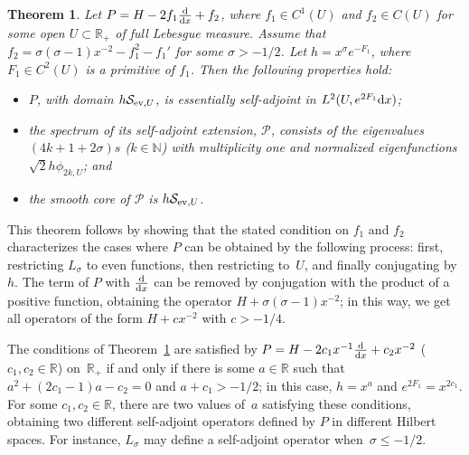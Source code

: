 \documentclass[11pt]{article}
\newtheorem{Theorem}{Theorem}[section]
\newcommand{\R}{\mathbb{R}}
\newcommand{\N}{\mathbb{N}}
\newcommand{\PP}{\mathcal{P}}
\renewcommand{\SS}{\mathcal{S}}
\begin{document}
\begin{Theorem}\label{t:P}
  Let $P=H-2f_1 \frac{{\rm d}}{{\rm d}x}+f_2$, where $f_1\in C^1(U)$ and $f_2\in C(U)$ for some open $U\subset\R_+$ of full Lebesgue measure. Assume that $f_2=\sigma(\sigma-1)x^{-2}-f_1^2-f_1'$ for some $\sigma>-1/2$. Let $h=x^\sigma e^{-F_1}$, where $F_1\in C^2(U)$ is a primitive of $f_1$. Then the following properties hold:
    \begin{itemize}\itemsep=0pt

      \item[$(i)$] $P$, with domain $h \SS_{\text{\rm ev},U}$, is essentially self-adjoint in $L^2(U,e^{2F_1}{\rm d}x)$;

      \item[$(ii)$] the spectrum of its self-adjoint extension, $\PP$, consists of the eigenvalues $(4k+1+2\sigma)s$ {\rm(}$k\in\N${\rm)} with multiplicity one and normalized eigenfunctions $\sqrt{2} h\phi_{2k,U}$; and

       \item[$(iii)$] the smooth core of $\PP$ is $h\SS_{\text{\rm ev},U}$.

    \end{itemize}
\end{Theorem}

This theorem follows by showing that the stated condition on $f_1$ and $f_2$ characterizes the cases where $P$ can be obtained by the following process: f\/irst, restricting $L_\sigma$ to even functions, then restricting to~$U$, and f\/inally conjugating by $h$. The term of $P$ with $\frac{{\rm d}}{{\rm d}x}$ can be removed by conjugation with the product of a positive function, obtaining the operator $H+\sigma(\sigma-1)x^{-2}$; in this way, we get all operators of the form $H+cx^{-2}$ with $c>-1/4$.

The conditions of Theorem~\ref{t:P} are satisf\/ied by $P=H-2c_1x^{-1}\frac{{\rm d}}{{\rm d}x}+c_2x^{-2}$ ($c_1,c_2\in\R$) on~$\R_+$ if and only if there is some $a\in\R$ such that $a^2+(2c_1-1)a-c_2=0$ and $a+c_1>-1/2$; in this case, $h=x^a$ and $e^{2F_1}=x^{2c_1}$. For some $c_1,c_2\in\R$, there are two values of~$a$ satisfying these conditions, obtaining two dif\/ferent self-adjoint operators def\/ined by $P$ in dif\/ferent Hilbert spaces. For instance, $L_\sigma$ may def\/ine a self-adjoint operator when~$\sigma\le-1/2$.
\end{document}
